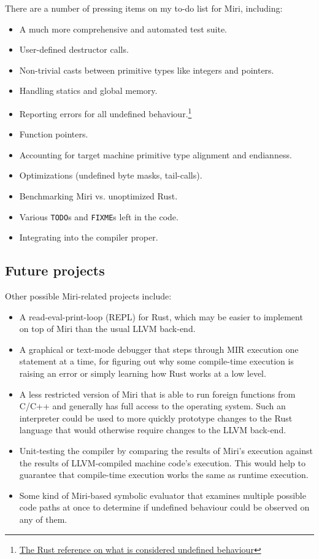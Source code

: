 \documentclass[twocolumn]{article}
\begin{document}
There are a number of pressing items on my to-do list for Miri, including:

\begin{itemize}
  \item A much more comprehensive and automated test suite.
  \item User-defined destructor calls.
  \item Non-trivial casts between primitive types like integers and pointers.
  \item Handling statics and global memory.
  \item Reporting errors for all undefined behaviour.\footnote{\href{https://doc.rust-lang.org/reference.html\#behavior-considered-undefined}{The Rust reference on what is considered undefined behaviour}}
  \item Function pointers.
  \item Accounting for target machine primitive type alignment and endianness.
  \item Optimizations (undefined byte masks, tail-calls).
  \item Benchmarking Miri vs. unoptimized Rust.
  \item Various \texttt{TODO}s and \texttt{FIXME}s left in the code.
  \item Integrating into the compiler proper.
\end{itemize}

\subsection{Future projects}

Other possible Miri-related projects include:

\begin{itemize}
  \item A read-eval-print-loop (REPL) for Rust, which may be easier to implement on top of Miri than
    the usual LLVM back-end.
  \item A graphical or text-mode debugger that steps through MIR execution one statement at a time,
    for figuring out why some compile-time execution is raising an error or simply learning how Rust
    works at a low level.
  \item A less restricted version of Miri that is able to run foreign functions from C/C++ and
    generally has full access to the operating system. Such an interpreter could be used to more
    quickly prototype changes to the Rust language that would otherwise require changes to the LLVM
    back-end.
  \item Unit-testing the compiler by comparing the results of Miri's execution against the results
    of LLVM-compiled machine code's execution. This would help to guarantee that compile-time
    execution works the same as runtime execution.
  \item Some kind of Miri-based symbolic evaluator that examines multiple possible code paths at
    once to determine if undefined behaviour could be observed on any of them.
\end{itemize}
\end{document}
